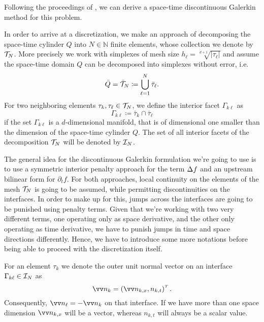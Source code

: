 \documentclass[../thesis.tex]{subfiles}
\begin{document}
Following the proceedings of \cite[Chapter 2]{Neumueller}, we can derive a space-time discontinuous Galerkin method for this problem.

In order to arrive at a discretization, we make an approach of decomposing the space-time cylinder $Q$ into $N \in \mathbb{N}$ finite elements, whose collection we denote by $\mathcal{T}_N$. More precisely we work with simplexes of mesh size $h_\ell = \sqrt[d+1]{|\tau_\ell|}$ and assume the space-time domain $Q$ can be decomposed into simplexes without error, i.e.
\[
	\bar{Q} = \bar{\mathcal{T}}_N \coloneqq \bigcup_{\ell=1}^N \bar{\tau}_\ell.
\]
For two neighboring elements $\tau_k, \tau_\ell \in \mathcal{T}_N$, we define the interior facet $\Gamma_{k \ell}$ as
\[
	\Gamma_{k \ell} \coloneqq \bar{\tau}_k \cap \bar{\tau}_\ell
\]
if the set $\Gamma_{k \ell}$ is a $d$-dimensional manifold, that is of dimensional one smaller than the dimension of the space-time cylinder $Q$. The set of all interior facets of the decomposition $\mathcal{T}_N$ will be denoted by $\mathcal{I}_N$.

The general idea for the discontinuous Galerkin formulation we're going to use is to use a symmetric interior penalty approach for the term $\Delta f$ and an upstream bilinear form for $\partial_t f$.
For both approaches, local continuity on the elements of the mesh $\mathcal{T}_N$ is going to be assumed, while permitting discontinuities on the interfaces. In order to make up for this, jumps across the interfaces are going to be punished using penalty terms.
Given that we're working with two very different terms, one operating only as space derivative, and the other only operating as time derivative, we have to punish jumps in time and space directions differently.
Hence, we have to introduce some more notations before being able to proceed with the discretization itself.

For an element $\tau_k$ we denote the outer unit normal vector on an interface $\Gamma_{k \ell} \in \mathcal{I}_N$ as
\[
	\markvec{n_k} = \left( \markvec{n_{k, x}}, n_{k, t} \right)^\tp.
\]
Consequently, $\markvec{n_\ell} = - \markvec{n_k}$ on that interface.
If we have more than one space dimension $\markvec{n_{k, x}}$ will be a vector, whereas $n_{k, t}$ will always be a scalar value.
\end{document}
